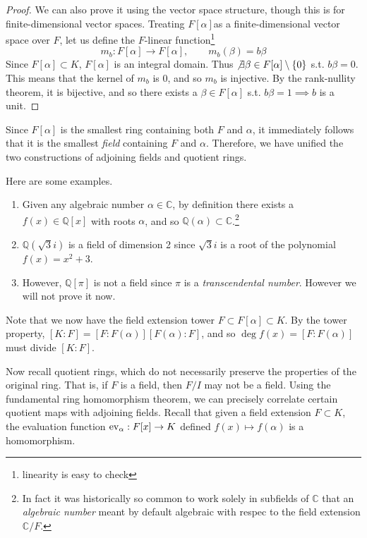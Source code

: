   \begin{proof}
    We can also prove it using the vector space structure, though this is for finite-dimensional vector spaces. Treating $F[\alpha]$as a finite-dimensional vector space over $F$, let us define the $F$-linear function\footnote{linearity is easy to check}
    \begin{equation}
      m_b: F[\alpha] \rightarrow F[\alpha], \qquad m_b (\beta) = b\beta
    \end{equation} 
    Since $F[\alpha] \subset K$, $F[\alpha]$ is an integral domain. Thus $\not\exists \beta \in F[\alpha] \setminus \{0\}$ s.t. $b \beta = 0$. This means that the kernel of $m_b$ is $0$, and so $m_b$ is injective. By the rank-nullity theorem, it is bijective, and so there exists a $\beta \in F[\alpha]$ s.t. $b \beta = 1 \implies b$ is a unit. 
  \end{proof} 

  Since $F[\alpha]$ is the smallest ring containing both $F$ and $\alpha$, it immediately follows that it is the smallest \textit{field} containing $F$ and $\alpha$. Therefore, we have unified the two constructions of adjoining fields and quotient rings. 

  \begin{example}
    Here are some examples. 
    \begin{enumerate}
      \item Given any algebraic number $\alpha \in \mathbb{C}$, by definition there exists a $f(x) \in \mathbb{Q}[x]$ with roots $\alpha$, and so $\mathbb{Q}(\alpha) \subset \mathbb{C}$.\footnote{In fact it was historically so common to work solely in subfields of $\mathbb{C}$ that an \textit{algebraic number} meant by default algebraic with respec to the field extension $\mathbb{C}/F$.}
      \item $\mathbb{Q}(\sqrt{3} i)$ is a field of dimension 2 since $\sqrt{3}i$ is a root of the polynomial $f(x) = x^2 + 3$. 
      \item However, $\mathbb{Q}[\pi]$ is not a field since $\pi$ is a \textit{transcendental number}. However we will not prove it now. 
    \end{enumerate}
  \end{example}

  Note that we now have the field extension tower $F \subset F[\alpha] \subset K$. By the tower property, $[K:F] = [F:F(\alpha)] [F(\alpha):F]$, and so $\deg{f(x)} = [F:F(\alpha)]$ must divide $[K:F]$. 

  Now recall quotient rings, which do not necessarily preserve the properties of the original ring. That is, if $F$ is a field, then $F/I$ may not be a field. Using the fundamental ring homomorphism theorem, we can precisely correlate certain quotient maps with adjoining fields. Recall that given a field extension $F \subset K$, the evaluation function $\ev_\alpha: F[x] \rightarrow K$ defined $f(x) \mapsto f(\alpha)$ is a homomorphism. 


